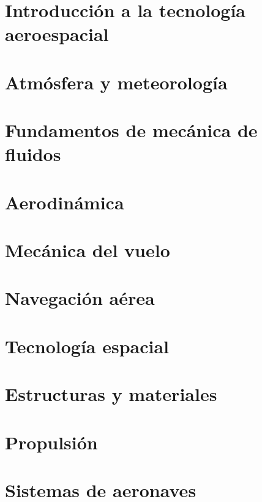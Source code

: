 \tableofcontents
\listoffigures
\mainmatter
\part{Introducción a la tecnología aeroespacial}

\part{Atmósfera y meteorología}

\part{Fundamentos de mecánica de fluidos}

\part{Aerodinámica}

\part{Mecánica del vuelo}

\part{Navegación aérea}

\part{Tecnología espacial}

\part{Estructuras y materiales}

\part{Propulsión}

\part{Sistemas de aeronaves}


\backmatter


